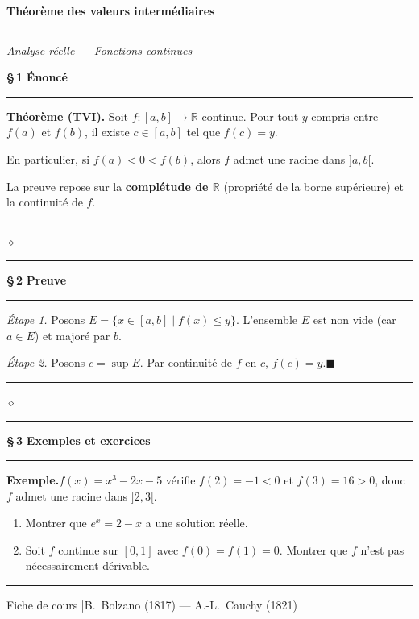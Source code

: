 \documentclass[a4paper,11pt]{article}
\newcommand{\lecontitle}[2]{%
  \thispagestyle{empty}
  \vspace*{6pt}
  {\fontsize{22}{28}\selectfont\bfseries\color{darkgray} #1}
  \par\vspace{4pt}
  \noindent\textcolor{bordeaux}{\rule{\textwidth}{1.5pt}}
  \par\vspace{4pt}
  {\large\itshape\color{darkgray!60} #2}
  \par\vspace{20pt}
}
\newcommand{\secnum}[3]{%
  \vspace{18pt}
  \noindent
  {\large\bfseries\color{bordeaux} \S\,#2\enspace}%
  {\large\bfseries\color{darkgray} #3}%
  \par\vspace{2pt}
  \noindent\textcolor{bordeaux!30}{\rule{\textwidth}{0.4pt}}
  \vspace{6pt}
}
\newcommand{\rubriq}[1]{%
  \vspace{8pt}
  \noindent{\bfseries\color{bordeaux} #1.}\enspace
}
\newcommand{\decsep}{%
  \vspace{12pt}
  \begin{center}
    \textcolor{bordeaux!60}{%
      \rule{30pt}{0.4pt}\quad$\diamond$\quad\rule{30pt}{0.4pt}}
  \end{center}
  \vspace{6pt}
}
\newcommand{\leconfooter}[1]{%
  \vfill
  \noindent\textcolor{darkgray!25}{\rule{\textwidth}{0.4pt}}
  \begin{center}
    \small\color{darkgray!45}
    Fiche de cours \quad|\quad #1
  \end{center}
}
\begin{document}
\lecontitle{Théorème des valeurs intermédiaires}{Analyse réelle — Fonctions continues}

\secnum{bordeaux}{1}{Énoncé}

\begin{tcolorbox}[thmbox]
  \textbf{Théorème (TVI).}\enspace
  Soit $f : [a,b] \to \mathbb{R}$ continue. Pour tout $y$ compris entre
  $f(a)$ et $f(b)$, il existe $c \in [a,b]$ tel que $f(c) = y$.

  \medskip En particulier, si $f(a) < 0 < f(b)$, alors $f$ admet une
  racine dans $]a,b[$.
\end{tcolorbox}

\rubriq{Ingrédient clé}
La preuve repose sur la \textbf{complétude de $\mathbb{R}$} (propriété de
la borne supérieure) et la continuité de $f$.

\decsep

\secnum{bordeaux}{2}{Preuve}

\begin{mdframed}[style=proofbar]
  \textit{Étape 1.} Posons $E = \{x \in [a,b] \mid f(x) \leq y\}$.
  L'ensemble $E$ est non vide (car $a \in E$) et majoré par $b$.

  \medskip
  \textit{Étape 2.} Posons $c = \sup E$. Par continuité de $f$ en $c$,
  $f(c) = y$.\hfill$\blacksquare$
\end{mdframed}

\decsep

\secnum{bordeaux}{3}{Exemples et exercices}

\begin{mdframed}[style=exbar]
  \textbf{Exemple.}\enspace $f(x) = x^3 - 2x - 5$ vérifie $f(2) = -1 < 0$
  et $f(3) = 16 > 0$, donc $f$ admet une racine dans $]2,3[$.
\end{mdframed}

\vspace{6pt}

\begin{mdframed}[style=exobar]
  \begin{enumerate}
    \item Montrer que $e^x = 2-x$ a une solution réelle.
    \item Soit $f$ continue sur $[0,1]$ avec $f(0) = f(1) = 0$.
          Montrer que $f$ n'est pas nécessairement dérivable.
  \end{enumerate}
\end{mdframed}

\leconfooter{B.\ Bolzano (1817) — A.-L.\ Cauchy (1821)}
\end{document}
